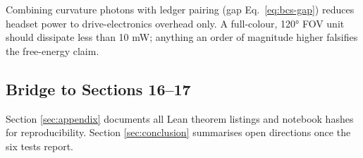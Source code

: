 Combining curvature photons with ledger pairing (gap Eq.~\eqref{eq:bcs-gap})
reduces headset power to drive-electronics overhead only.  A full-colour,
120° FOV unit should dissipate less than 10 mW; anything an order of
magnitude higher falsifies the free-energy claim.

\subsection{Bridge to Sections 16–17}

Section \ref{sec:appendix} documents all Lean theorem listings and
notebook hashes for reproducibility.  Section \ref{sec:conclusion}
summarises open directions once the six tests report.

\clearpage
